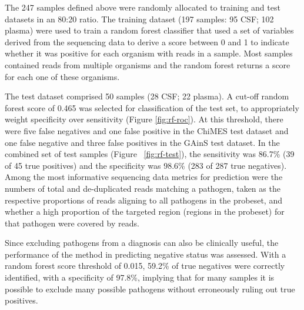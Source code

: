 The 247 samples defined above were randomly allocated to training and test datasets in an 80:20 ratio. The training dataset (197 samples: 95 CSF; 102 plasma) were used to train a random forest classifier that used a set of variables derived from the sequencing data to derive a score between 0 and 1 to indicate whether it was positive for each organism with reads in a sample. Most samples contained reads from multiple organisms and the random forest returns a score for each one of these organisms.

The test dataset comprised 50 samples (28 CSF; 22 plasma). A cut-off random forest score of 0.465 was selected for classification of the test set, to appropriately weight specificity over sensitivity (Figure \ref{fig:rf-roc}). At this threshold, there were five false negatives and one false positive in the ChiMES test dataset and one false negative and three false positives in the GAinS test dataset. In the combined set of test samples (Figure ~\ref{fig:rf-test}), the sensitivity was 86.7\% (39 of 45 true positives) and the specificity was 98.6\% (283 of 287 true negatives). Among the most informative sequencing data metrics for prediction were the numbers of total and de-duplicated reads matching a pathogen, taken as the respective proportions of reads aligning to all pathogens in the probeset, and whether a high proportion of the targeted region (regions in the probeset) for that pathogen were covered by reads. 

Since excluding pathogens from a diagnosis can also be clinically useful, the performance of the method in predicting negative status was assessed. With a random forest score threshold of 0.015, 59.2\% of true negatives were correctly identified, with a specificity of 97.8\%, implying that for many samples it is possible to exclude many possible pathogens without erroneously ruling out true positives.

